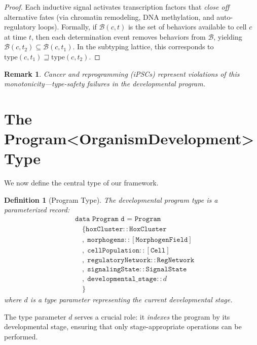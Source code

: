 \documentclass[12pt,a4paper]{article}
\newtheorem{definition}[theorem]{Definition}
\newtheorem{remark}[theorem]{Remark}
\begin{document}
\begin{proof}
Each inductive signal activates transcription factors that
\emph{close off} alternative fates (via chromatin remodeling,
DNA methylation, and auto-regulatory loops).  Formally, if
$\mathcal{B}(c,t)$ is the set of behaviors available to cell $c$
at time $t$, then each determination event removes behaviors
from $\mathcal{B}$, yielding
$\mathcal{B}(c,t_2) \subseteq \mathcal{B}(c,t_1)$.  In the
subtyping lattice, this corresponds to
$\text{type}(c,t_1) \sqsupseteq \text{type}(c,t_2)$.
\end{proof}

\begin{remark}
Cancer and reprogramming (iPSCs) represent violations of this
monotonicity---type-safety failures in the developmental program.
\end{remark}


\section{The Program\textless{}OrganismDevelopment\textgreater{} Type}\label{sec:program-type}

We now define the central type of our framework.

\begin{definition}[Program Type]\label{def:program-type}
The \emph{developmental program type} is a parameterized record:
\begin{align*}
  &\texttt{data Program d = Program} \\
  &\quad \{ \texttt{hoxCluster} :: \texttt{HoxCluster} \\
  &\quad ,\; \texttt{morphogens} :: [\texttt{MorphogenField}] \\
  &\quad ,\; \texttt{cellPopulation} :: [\texttt{Cell}] \\
  &\quad ,\; \texttt{regulatoryNetwork} :: \texttt{RegNetwork} \\
  &\quad ,\; \texttt{signalingState} :: \texttt{SignalState} \\
  &\quad ,\; \texttt{developmental\_stage} :: d \\
  &\quad \}
\end{align*}
where $d$ is a type parameter representing the current developmental
stage.
\end{definition}

The type parameter $d$ serves a crucial role: it \emph{indexes} the
program by its developmental stage, ensuring that only stage-appropriate
operations can be performed.
\end{document}
